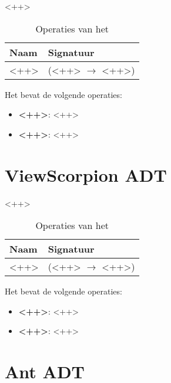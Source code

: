 <++>

\begin{table}[hbt]
\centering
\begin{tabular}{|ll|}
\hline
\rowcolor[HTML]{000000} 
{\color[HTML]{FFFFFF} \textbf{Naam}} & {\color[HTML]{FFFFFF} \textbf{Signatuur}} \\ \hline
<++>                                 & (<++> $\rightarrow$ <++>)                                       \\ \hline
\end{tabular}
\caption{Operaties van het \texttt{}}
\label{table:scorpion}
\end{table}

Het \texttt{} bevat de volgende operaties:

\begin{itemize}
	\item \textbf{<++>}: <++>
	\item \textbf{<++>}: <++>
\end{itemize}

\section{View\textunderscore Scorpion ADT}
\label{section:view_scorpion}

<++>

\begin{table}[hbt]
\centering
\begin{tabular}{|ll|}
\hline
\rowcolor[HTML]{000000} 
{\color[HTML]{FFFFFF} \textbf{Naam}} & {\color[HTML]{FFFFFF} \textbf{Signatuur}} \\ \hline
<++>                                 & (<++> $\rightarrow$ <++>)                                       \\ \hline
\end{tabular}
\caption{Operaties van het \texttt{}}
\label{table:view_scorpion}
\end{table}

Het \texttt{} bevat de volgende operaties:

\begin{itemize}
	\item \textbf{<++>}: <++>
	\item \textbf{<++>}: <++>
\end{itemize}

\section{Ant ADT}
\label{section:ant}

